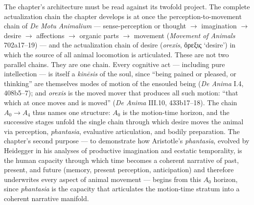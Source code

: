 \documentclass{article}
\newcommand{\gk}[1]{{\greekfont #1}}
\begin{document}
The chapter's architecture must be read against its twofold project. The complete actualization chain the chapter develops is at once the perception-to-movement chain of \textit{De Motu Animalium} --- sense-perception or thought $\rightarrow$ imagination $\rightarrow$ desire $\rightarrow$ affections $\rightarrow$ organic parts $\rightarrow$ movement (\textit{Movement of Animals} 702a17--19) --- and the actualization chain of desire (\textit{orexis}, \gk{ὄρεξις} `desire') in which the source of all animal locomotion is articulated. These are not two parallel chains. They are one chain. Every cognitive act --- including pure intellection --- is itself a \textit{kinēsis} of the soul, since ``being pained or pleased, or thinking'' are themselves modes of motion of the ensouled being (\textit{De Anima} I.4, 408b5--7); and \textit{orexis} is the moved mover that produces all such motion: ``that which at once moves and is moved'' (\textit{De Anima} III.10, 433b17--18). The chain $A_0 \rightarrow A_4$ thus names one structure: $A_0$ is the motion-time horizon, and the successive stages unfold the single chain through which desire moves the animal via perception, \textit{phantasia}, evaluative articulation, and bodily preparation. The chapter's second purpose --- to demonstrate how Aristotle's \textit{phantasia}, evolved by Heidegger in his analyses of productive imagination and ecstatic temporality, is the human capacity through which time becomes a coherent narrative of past, present, and future (memory, present perception, anticipation) and therefore underwrites every aspect of animal movement --- begins from this $A_0$ horizon, since \textit{phantasia} is the capacity that articulates the motion-time stratum into a coherent narrative manifold.
\end{document}
